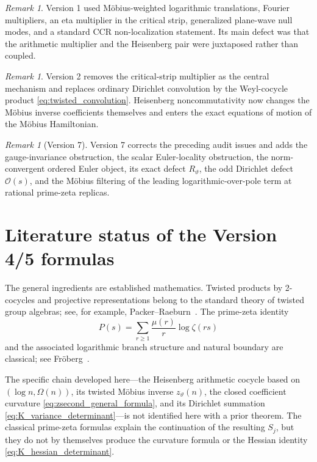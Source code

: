 \documentclass[11pt]{amsart}
\numberwithin{equation}{section}
\theoremstyle{plain}
\theoremstyle{definition}
\theoremstyle{remark}
\newtheorem{remark}[theorem]{Remark}
\begin{document}
\begin{remark}
\label{rem:history_v1}
Version 1 used M\"obius-weighted logarithmic translations, Fourier
multipliers, an eta multiplier in the critical strip, generalized plane-wave
null modes, and a standard CCR non-localization statement.  Its main defect
was that the arithmetic multiplier and the Heisenberg pair were juxtaposed
rather than coupled.
\end{remark}

\begin{remark}
\label{rem:history_v2}
Version 2 removes the critical-strip multiplier as the central mechanism and
replaces ordinary Dirichlet convolution by the Weyl-cocycle product
\eqref{eq:twisted_convolution}.  Heisenberg noncommutativity now changes the
M\"obius inverse coefficients themselves and enters the exact equations of
motion of the M\"obius Hamiltonian.
\end{remark}




\begin{remark}[Version 7]
\label{rem:history_v7}
Version 7 corrects the preceding audit issues and adds the gauge-invariance
obstruction, the scalar Euler-locality obstruction, the norm-convergent
ordered Euler object, its exact defect \(R_\vartheta\), the odd Dirichlet
defect \(\mathcal O(s)\), and the M\"obius filtering of the leading
logarithmic-over-pole term at rational prime-zeta replicas.
\end{remark}

\section{Literature status of the Version 4/5 formulas}
\label{sec:literature_status_v5}

The general ingredients are established mathematics.  Twisted products by
2-cocycles and projective representations belong to the standard theory of
twisted group algebras; see, for example, Packer--Raeburn~\cite{PackerRaeburn1992}.
The prime-zeta identity
\begin{equation}
P(s)=\sum_{r\ge1}\frac{\mu(r)}r\log\zeta(rs)
\label{eq:literature_prime_zeta_identity}
\end{equation}
and the associated logarithmic branch structure and natural boundary are
classical; see Fr\"oberg~\cite{Froberg1968}.

The specific chain developed here---the Heisenberg arithmetic cocycle based on
\((\log n,\Omega(n))\), its twisted M\"obius inverse \(z_\vartheta(n)\), the
closed coefficient curvature
\eqref{eq:zsecond_general_formula}, and its Dirichlet summation
\eqref{eq:K_variance_determinant}---is not identified here with a prior theorem.
The classical prime-zeta formulas explain the continuation of the resulting
\(S_j\), but they do not by themselves produce the curvature formula or the
Hessian identity \eqref{eq:K_hessian_determinant}.
\end{document}
